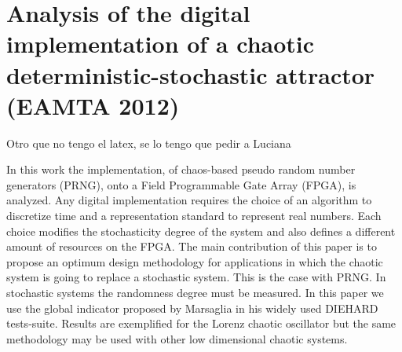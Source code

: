 \section{Analysis of the digital implementation of a chaotic deterministic-stochastic attractor (EAMTA 2012)}

Otro que no tengo el latex, se lo tengo que pedir a Luciana

In this work the implementation, of chaos-based
pseudo random number generators (PRNG), onto a Field Programmable Gate Array (FPGA), is analyzed. Any digital implementation requires the choice of an algorithm to discretize
time and a representation standard to represent real numbers.
Each choice modifies the stochasticity degree of the system and
also defines a different amount of resources on the FPGA. The
main contribution of this paper is to propose an optimum design
methodology for applications in which the chaotic system is going
to replace a stochastic system. This is the case with PRNG. In
stochastic systems the randomness degree must be measured. In
this paper we use the global indicator proposed by Marsaglia
in his widely used DIEHARD tests-suite. Results are exemplified
for the Lorenz chaotic oscillator but the same methodology may
be used with other low dimensional chaotic systems.
